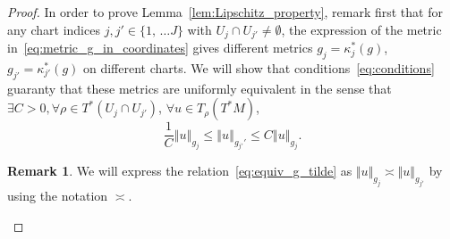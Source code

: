 \documentclass[10pt]{amsart}
\theoremstyle{definition}\newtheorem{defi}[theo]{Definition}\newtheorem{rema}[theo]{Remark}\newtheorem{exam}[theo]{Example}\newtheorem{exem}[theo]{Example}\newtheorem{nota}[theo]{Notation}
\let\oldexists\exists
\renewcommand*{\exists}{\mathrel{\oldexists}}
\let\oldforall\forall
\renewcommand*{\forall}{\mathrel{\oldforall}}
\begin{document}
\begin{proof}
In order to prove Lemma~\ref{lem:Lipschitz_property}, remark first that for any chart indices $j,j'\in\{1,\,\ldots J\} $ with $U_{j}\cap U_{j'}\neq\emptyset$, the expression of the metric in~\eqref{eq:metric_g_in_coordinates} gives different metrics $g_{j}=\kappa_{j}^{*}(g)$, $g_{j'}=\kappa_{j'}^{*}(g)$ on different charts. We will show that conditions~\eqref{eq:conditions} guaranty that these metrics are uniformly equivalent in the sense that $\exists C>0,\forall\rho\in T^{*}(U_{j}\cap U_{j'})$, $\forall u\in T_{\rho}(T^{*}M)$,
\begin{equation}\label{eq:equiv_g_tilde}
\frac{1}{C}\left\Vert u\right\Vert _{g_{j}}\leq\left\Vert u\right\Vert _{g_{j'}'}\leq C\left\Vert u\right\Vert _{g_{j}}.
\end{equation}

\begin{rema}\label{rem:asympt}
We will express the relation~\eqref{eq:equiv_g_tilde} as $\Vert u\Vert _{g_{j}}\asymp\Vert u\Vert _{g_{j'}}$ by using the notation $\asymp$.
\end{rema}


\end{proof}
\end{document}
